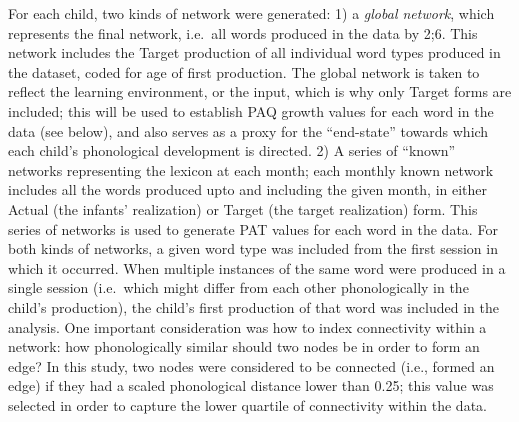 \documentclass[
  english,
  man,floatsintext]{apa6}
\begin{document}
For each child, two kinds of network were generated: 1) a \emph{global network}, which represents the final network, i.e.~all words produced in the data by 2;6. This network includes the Target production of all individual word types produced in the dataset, coded for age of first production. The global network is taken to reflect the learning environment, or the input, which is why only Target forms are included; this will be used to establish PAQ growth values for each word in the data (see below), and also serves as a proxy for the \enquote{end-state} towards which each child's phonological development is directed. 2) A series of \enquote{known} networks representing the lexicon at each month; each monthly known network includes all the words produced upto and including the given month, in either Actual (the infants' realization) or Target (the target realization) form. This series of networks is used to generate PAT values for each word in the data. For both kinds of networks, a given word type was included from the first session in which it occurred. When multiple instances of the same word were produced in a single session (i.e.~which might differ from each other phonologically in the child's production), the child's first production of that word was included in the analysis. One important consideration was how to index connectivity within a network: how phonologically similar should two nodes be in order to form an edge? In this study, two nodes were considered to be connected (i.e., formed an edge) if they had a scaled phonological distance lower than 0.25; this value was selected in order to capture the lower quartile of connectivity within the data.
\end{document}

